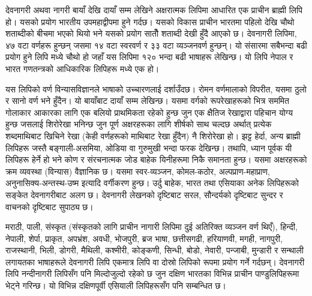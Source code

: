 \documentclass[a4paper,12pt,oneside,final]{article}
\begin{document}
देवनागरी अथवा नागरी बायाँ देखि दायाँ सम्म लेखिने अक्षरात्मक लिपिमा आधारित एक प्राचीन ब्राह्मी लिपि हो। यसको प्रयोग भारतीय उपमहाद्वीपमा हुने गर्दछ। यसको विकास प्राचीन भारतमा पहिलो देखि चौथो शताब्दीको बीचमा भएको थियो भने यसको प्रयोग सातौँ शताब्दी देखी हुँदै आएको छ। देवनागरी लिपिमा, ४७ वटा वर्णहरू हुन्छन् जसमा १४ वटा स्वरवर्ण र ३३ वटा व्यञ्जनवर्ण हुन्छन्। यो संसारमा सबैभन्दा बढी प्रयोग हुने लिपि मध्ये चौथो हो जहाँ यस लिपिमा १२० भन्दा बढी भाषाहरू लेखिन्छ। यो लिपि नेपाल र भारत गणतन्त्रको आधिकारिक लिपिहरू मध्ये एक हो।

यस लिपिको वर्ण विन्यासविज्ञानले भाषाको उच्चारणलाई दर्शाउँदछ। रोमन वर्णमालाको विपरीत, यसमा ठुलो र सानो वर्ण भने हुँदैन। यो बायाँबाट दायाँ सम्म लेखिन्छ। यसमा वर्गको रूपरेखाहरूको भित्र सममित गोलाकार आकारका लागि एक बलियो प्राथमिकता रहेको हुन्छ जुन एक क्षैतिज रेखाद्वारा पहिचान योग्य हुन्छ जसलाई शिरोरेखा भनिन्छ जुन पूर्ण अक्षरहरूका लागि शीर्षको साथ चल्दछ अर्थात् प्रत्येक शब्दमाथिबाट खिचिने रेखा (केही वर्णहरूको माथिबाट रेखा हुँदैन) नै शिरोरेखा हो। झट्ट हेर्दा, अन्य ब्राह्मी लिपिहरू जस्तै बङ्गाली-असमिया, ओडिया वा गुरुमुखी भन्दा फरक देखिन्छ। तथापि, ध्यान पूर्वक यी लिपिहरू हेर्ने हो भने कोण र संरचनात्मक जोड बाहेक यिनीहरूमा निकै समानता हुन्छ। यसमा अक्षरहरूको क्रम व्यवस्था (विन्यास) वैज्ञानिक छ। यसमा स्वर-व्यञ्जन, कोमल-कठोर, अल्पप्राण-महाप्राण, अनुनासिक्य-अन्तस्थ-उष्म इत्यादि वर्गीकरण हुन्छ। उर्दु बाहेक, भारत तथा एसियाका अनेक लिपिहरूको सङ्केत देवनागरीबाट अलग छ। देवनागरी लेखनको दृष्टिबाट सरल, सौन्दर्यको दृष्टिबाट सुन्दर र वाचनको दृष्टिबाट सुपाठ्य छ।

मराठी, पाली, संस्कृत (संस्कृतको लागि प्राचीन नागारी लिपिमा दुई अतिरिक्त व्यञ्जन वर्ण थिएँ), हिन्दी, नेपाली, शेर्पा, प्राकृत, अपभ्रंश, अवधी, भोजपुरी, ब्रज भाषा, छत्तीसगढी, हरियाणवी, मगही, नागपुरी, राजस्थानी, भिली, डोगरी, मैथिली, कश्मीरी, कोङ्कणी, सिन्धी, बोडो, नेवारी, पन्जाबी, मुन्डारी र सन्थाली लगायतका भाषाहरूले देवनागरी लिपि एकमात्र लिपि वा दोस्रो लिपिको रूपमा प्रयोग गर्ने गर्दछन्। देवनागरी लिपि नन्दीनागरी लिपिसँग पनि मिल्दोजुल्दो रहेको छ जुन दक्षिण भारतका विभिन्न प्राचीन पाण्डुलिपिहरूमा भेट्ने गरिन्छ। यो विभिन्न दक्षिणपूर्वी एसियाली लिपिहरूसँग पनि सम्बन्धित छ।
\end{document}
